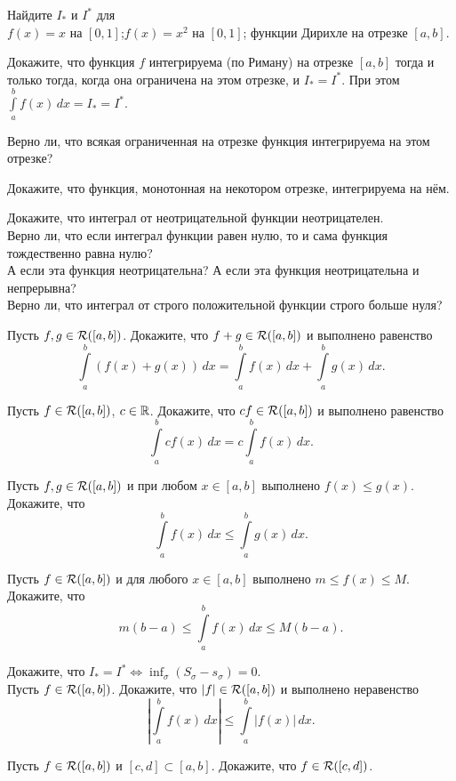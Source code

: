 \documentclass[a4paper, 11pt]{article}
\newcommand{\0}[1]{\overline{#1}}
\newcommand{\RpR}{{\cal R}([a,b])}
\newcommand{\intab}{\int\limits_a^b}
\begin{document}
 Найдите $I_*$ и $I^*$ для\\
   $f(x)=x$ на $[0,1]$; $f(x)=x^2$ на $[0,1]$;
  функции Дирихле на отрезке
 $[a,b]$.

\newpage

 \label{first}
Докажите, что функция $f$ интегрируема (по Риману) на отрезке $[a,b]$ тогда и только тогда, когда
она ограничена на этом отрезке, и $I_* =I^*$.
При этом $\int\limits_{a}^{b} f(x)\,dx=I_* =I^*$.

 Верно ли, что всякая ограниченная на отрезке функция интегрируема
на этом отрезке?

Докажите, что функция, монотонная на некотором отрезке, интегрируема на
н\"ем.


  Докажите, что интеграл от неотрицательной функции
неотрицателен.\\
 Верно ли, что если интеграл функции равен нулю, то и сама
функция тождественно равна нулю?\\
 А если эта функция неотрицательна?
 А если эта функция неотрицательна и непрерывна?\\
 Верно ли, что интеграл от строго положительной функции
строго больше нуля?

 Пусть $f,g\in \RpR$. Докажите, что $f+ g\in \RpR$ и  выполнено равенство
$$\int\limits_a^b(f(x)+ g(x))\,dx =
\int\limits_a^bf(x)\,dx+ \int\limits_a^bg(x)\,dx.$$


 Пусть $f\in \RpR$, $c\in\mathbb{R}$. Докажите, что  $c f\in \RpR$ и выполнено равенство
$$\int\limits_a^bcf(x)\,dx  = c\int\limits_a^bf(x)\,dx.$$


 Пусть $f,g\in\RpR$ и при любом $x\in[a,b]$
выполнено $f(x)\le g(x)$. Докажите, что $$\intab f(x)\,dx \le \intab g(x)\,dx.$$

 Пусть $f\in \RpR$ и для любого $x\in[a,b]$ выполнено $m\le f(x)\le M$. Докажите,
что $$m(b-a)\le\intab f(x)\,dx\le M(b-a).$$

Докажите, что $I_*=I^* \iff \inf_{\sigma} (S_\sigma-s_\sigma) = 0$.\\
Пусть $f \in \RpR$. Докажите, что $|f|\in \RpR$ и выполнено неравенство
$$\left|\int\limits_a^b f(x)\,dx\right| \leq
\int\limits_a^b|f(x)|\, dx.$$

 Пусть  $f\in \RpR$ и $[c,d]\subset [a,b]$. Докажите, что $f\in
{\cal R}([c,d])$.
\end{document}
